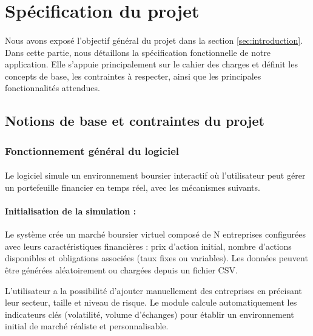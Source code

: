 \newpage
\section{Spécification du projet}
\label{sec:specification}

\paragraph{}Nous avons exposé l’objectif général du projet dans la  section \ref{sec:introduction}.
Dans cette partie, nous détaillons la spécification fonctionnelle de notre application.
Elle s’appuie principalement sur le cahier des charges et définit les concepts de base, les contraintes à respecter, ainsi que les principales fonctionnalités attendues.



\subsection{Notions de base et contraintes du projet}
\label{sec:spec1}

\subsubsection{Fonctionnement général du logiciel}

\paragraph{}Le logiciel simule un environnement boursier interactif où l’utilisateur peut gérer un
portefeuille financier en temps réel, avec les mécanismes suivants.
\paragraph{Initialisation de la simulation :}



Le système crée un marché boursier virtuel composé de N entreprises
configurées avec leurs caractéristiques financières : prix d'action initial, nombre
d'actions disponibles et obligations associées (taux fixes ou variables). Les données peuvent être générées aléatoirement ou chargées depuis un fichier CSV. 

L'utilisateur a la possibilité d'ajouter manuellement des entreprises en précisant
leur secteur, taille et niveau de risque. Le module calcule automatiquement les
indicateurs clés (volatilité, volume d'échanges) pour établir un environnement
initial de marché réaliste et personnalisable.

